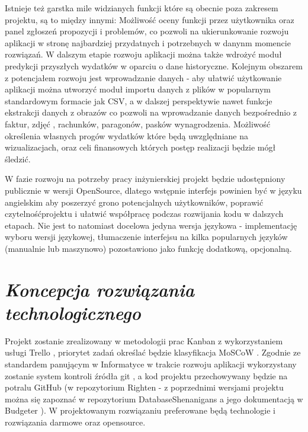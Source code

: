 \documentclass[a4paper,10pt, twoside]{report}
\newcommand{\customstylesection}[1]{\textbf{\textit{#1}}}
\begin{document}
\begin{large}
\medskip
{Istnieje też garstka mile widzianych funkcji które są obecnie poza zakresem 
projektu, są to między innymi: Możliwość oceny funkcji przez 
użytkownika oraz panel zgłoszeń propozycji i problemów, co pozwoli na 
ukierunkowanie rozwoju aplikacji w stronę najbardziej przydatnych i potrzebnych 
w danynm momencie rozwiązań. W dalszym etapie rozwoju aplikacji można także 
wdrożyć moduł predykcji przyszłych wydatków w oparciu o dane historyczne. 
Kolejnym obszarem z potencjałem rozwoju jest wprowadzanie danych - aby ułatwić 
użytkowanie aplikacji można utworzyć moduł importu danych z plików w popularnym 
standardowym formacie jak CSV, a w dalszej perspektywie nawet funkcje ekstrakcji
 danych z obrazów co pozwoli na wprowadzanie danych bezpośrednio z faktur, zdjęć
, rachunków, paragonów, pasków wynagrodzenia. Możliwość określenia własnych 
progów wydatków które będą uwzględniane na wizualizacjach, oraz celi finansowych
 których postęp realizacji będzie mógł śledzić.}

{W fazie rozwoju na potrzeby pracy inżynierskiej projekt będzie udostępniony 
publicznie w wersji OpenSource, dlatego wstępnie interfejs powinien być w 
języku angielskim aby poszerzyć grono potencjalnych użytkowników, poprawić 
czytelnośćprojektu i ułatwić współpracę podczas rozwijania kodu w dalszych 
etapach. Nie jest to natomiast docelowa jedyna wersja językowa - implementację 
wyboru wersji językowej, tłumaczenie interfejsu na kilka popularnych języków 
(manualnie lub maszynowo) pozostawiono jako funkcję dodatkową, opcjonalną.}

\section{\customstylesection{Koncepcja rozwiązania technologicznego}}
{Projekt zostanie zrealizowany w metodologii prac Kanban \cite{Kanban} z 
wykorzystaniem usługi Trello \cite{Trello}, priorytet zadań określać będzie 
klasyfikacja MoSCoW \cite{MOSCOW}. Zgodnie ze standardem panującym w Informatyce
w trakcie rozwoju aplikacji wykorzystany zostanie system kontroli źródła 
git \cite{GIT}, a kod projektu przechowywany będzie na potralu 
GitHub \cite{GitHub} (w repozytorium Righten \cite{GITRighten} - z poprzednimi 
wersjami projektu można się zapoznać w repozytorium 
DatabaseShenanigans \cite{GITBudgeterApp} a jego dokumentacją w 
Budgeter \cite{GITBudgeterDoc}). W projektowanym rozwiązaniu preferowane będą 
technologie i rozwiązania darmowe oraz opensource.}


\end{large}
\end{document}
